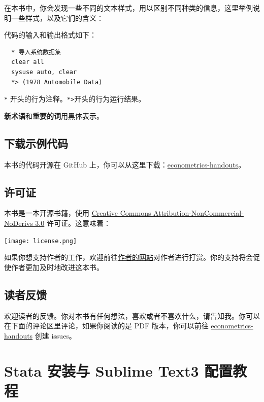 \documentclass[cn,fancy,blue,11pt]{elegantbook}
\begin{document}
在本书中，你会发现一些不同的文本样式，用以区别不同种类的信息，这里举例说明一些样式，以及它们的含义：

代码的输入和输出格式如下：

\begin{lstlisting}
  * 导入系统数据集
  clear all
  sysuse auto, clear
  *> (1978 Automobile Data)
\end{lstlisting}

\lstinline{*} 开头的行为注释。\lstinline{*>}开头的行为运行结果。

\textbf{新术语}和\textbf{重要的词}用黑体表示。

\hypertarget{section-5}{%
\section{下载示例代码}\label{section-5}}

本书的代码开源在 GitHub 上，你可以从这里下载：\href{https://github.com/czxa/econometrics-handouts}{econometrics-handouts}。

\hypertarget{section-6}{%
\section{许可证}\label{section-6}}

本书是一本开源书籍，使用 \href{http://creativecommons.org/licenses/by-nc-nd/3.0/us/}{Creative Commons Attribution-NonCommercial-NoDerivs 3.0} 许可证。这意味着：

\noindent\texttt{[image: license.png]}

如果你想支持作者的工作，欢迎前往\href{https://www.czxa.top}{作者的网站}对作者进行打赏。你的支持将会促使作者更加及时地改进这本书。

\hypertarget{section-7}{%
\section{读者反馈}\label{section-7}}

欢迎读者的反馈。你对本书有任何想法，喜欢或者不喜欢什么，请告知我。你可以在下面的评论区里评论，如果你阅读的是 PDF 版本，你可以前往 \href{https://github.com/czxa/econometrics-handouts}{econometrics-handouts} 创建 issues。

\hypertarget{stata--sublime-text3-}{%
\chapter{Stata 安装与 Sublime Text3 配置教程}\label{stata--sublime-text3-}}
\end{document}
